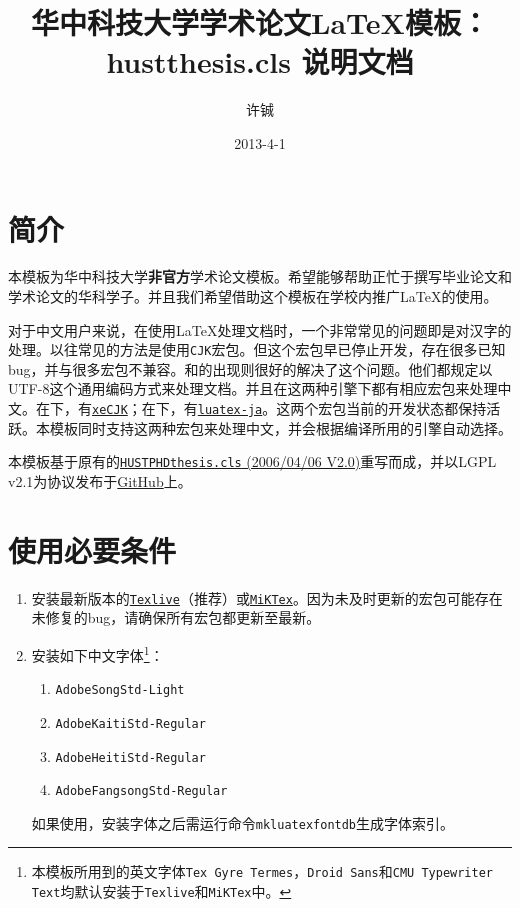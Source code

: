 \documentclass[12pt,a4paper,numbered,full]{l3doc}
\begin{document}
\title{华中科技大学学术论文\LaTeX{}模板：hustthesis.cls 说明文档}
\author{许铖}
\date{2013-4-1}

\maketitle

\tableofcontents

\section{简介}

本模板为华中科技大学\textbf{非官方}学术论文模板。希望能够帮助正忙于撰写毕业论文和学术论文的华科学子。并且我们希望借助这个模板在学校内推广\LaTeX{}的使用。

对于中文用户来说，在使用\LaTeX{}处理文档时，一个非常常见的问题即是对汉字的处理。以往常见的方法是使用\verb+CJK+宏包。但这个宏包早已停止开发，存在很多已知bug，并与很多宏包不兼容。\XeTeX{}和\LuaTeX{}的出现则很好的解决了这个问题。他们都规定以UTF-8这个通用编码方式来处理文档。并且在这两种引擎下都有相应宏包来处理中文。在\XeLaTeX{}下，有\href{http://mirrors.ctan.org/help/Catalogue/entries/xecjk.html}{\texttt{xeCJK}}；在\LuaLaTeX{}下，有\href{http://mirrors.ctan.org/help/Catalogue/entries/luatexja.html}{\texttt{luatex-ja}}。这两个宏包当前的开发状态都保持活跃。本模板同时支持这两种宏包来处理中文，并会根据编译所用的引擎自动选择。

本模板基于原有的\href{http://sourceforge.net/projects/hustthesis}{\texttt{HUSTPHDthesis.cls}  (2006/04/06 V2.0)}重写而成，并以LGPL v2.1为协议发布于\href{https://github.com/michael911009/HUSTThesis}{GitHub}上。

\section{使用必要条件}

\begin{enumerate}
    \item 安装最新版本的\href{http://www.tug.org/texlive/}{\texttt{Texlive}}（推荐）或\href{http://miktex.org/}{\texttt{MiKTex}}。因为未及时更新的宏包可能存在未修复的bug，请确保所有宏包都更新至最新。
    \item 安装如下中文字体\footnote{本模板所用到的英文字体\texttt{Tex Gyre Termes}，\texttt{Droid Sans}和\texttt{CMU Typewriter Text}均默认安装于\texttt{Texlive}和\texttt{MiKTex}中。}：
    \begin{enumerate}[label=\emph{\alph*})]
        \item \verb+AdobeSongStd-Light+
        \item \verb+AdobeKaitiStd-Regular+
        \item \verb+AdobeHeitiStd-Regular+
        \item \verb+AdobeFangsongStd-Regular+
    \end{enumerate}
    \begin{informationnote}
    如果使用\textnormal{\LuaTeX}，安装字体之后需运行命令\verb+mkluatexfontdb+生成字体索引。
    \end{informationnote}
\end{enumerate}
\end{document}
